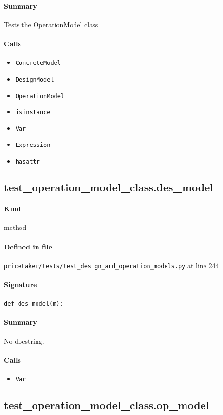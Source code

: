 \documentclass[11pt]{report}
\begin{document}
\paragraph{Summary} Tests the OperationModel class
\paragraph{Calls}
\begin{itemize}[leftmargin=*]
  \item \texttt{ConcreteModel}
  \item \texttt{DesignModel}
  \item \texttt{OperationModel}
  \item \texttt{isinstance}
  \item \texttt{Var}
  \item \texttt{Expression}
  \item \texttt{hasattr}
\end{itemize}
\subsection{test\_operation\_model\_class.des\_model}
\label{def:pricetaker-tests-test_design_and_operation_models.py:test_operation_model_class.des_model:L244}
\paragraph{Kind} method
\paragraph{Defined in file} \texttt{pricetaker/tests/test\_design\_and\_operation\_models.py} at line 244
\paragraph{Signature} \texttt{def des\_model(m):}
\paragraph{Summary} No docstring.
\paragraph{Calls}
\begin{itemize}[leftmargin=*]
  \item \texttt{Var}
\end{itemize}
\subsection{test\_operation\_model\_class.op\_model}
\label{def:pricetaker-tests-test_design_and_operation_models.py:test_operation_model_class.op_model:L249}
\end{document}
